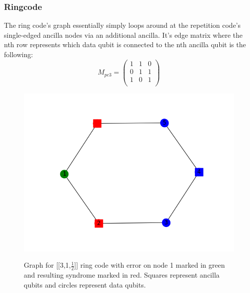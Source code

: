 \subsubsection{Ringcode}
The ring code's graph essentially simply loops around at the repetition
code's single-edged ancilla nodes via an additional ancilla. 
It's edge matrix where the nth row
represents which data qubit is connected to the nth ancilla
qubit is the following:
\begin{equation}
    M_{pc3} = \left(
        \begin{array}{ccc}
            1 & 1 & 0\\
            0 & 1 & 1\\
            1 & 0 & 1\\
        \end{array}
        \right)
\end{equation}

\begin{figure}[h!]
	\begin{center}
	\captionsetup{justification=centering,margin=2cm}
	\includegraphics[scale=0.25]{./img/figures/ring_3_graph.png}\\
	\caption{Graph for [[3,1,$\frac{1}{2}$]] ring code with error on node
    1 marked in green and resulting syndrome marked in red.
    Squares represent ancilla qubits and circles represent data qubits.}
        
	\label{fig: ring_graph}
	\end{center}
\end{figure}


